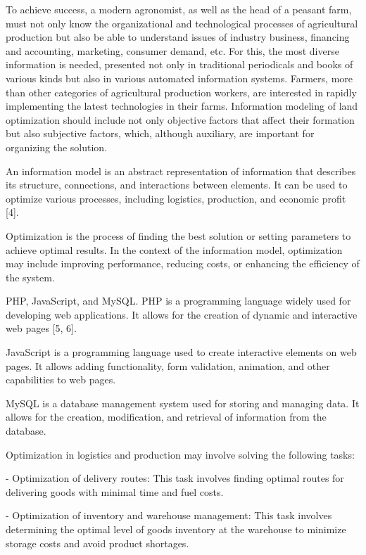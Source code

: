 To achieve success, a modern agronomist, as well as the head of a
peasant farm, must not only know the organizational and technological
processes of agricultural production but also be able to understand
issues of industry business, financing and accounting, marketing,
consumer demand, etc. For this, the most diverse information is needed,
presented not only in traditional periodicals and books of various kinds
but also in various automated information systems. Farmers, more than
other categories of agricultural production workers, are interested in
rapidly implementing the latest technologies in their farms. Information
modeling of land optimization should include not only objective factors
that affect their formation but also subjective factors, which, although
auxiliary, are important for organizing the solution.

An information model is an abstract representation of information that
describes its structure, connections, and interactions between elements.
It can be used to optimize various processes, including logistics,
production, and economic profit {[}4{]}.

Optimization is the process of finding the best solution or setting
parameters to achieve optimal results. In the context of the information
model, optimization may include improving performance, reducing costs,
or enhancing the efficiency of the system.

PHP, JavaScript, and MySQL. PHP is a programming language widely used
for developing web applications. It allows for the creation of dynamic
and interactive web pages {[}5, 6{]}.

JavaScript is a programming language used to create interactive elements
on web pages. It allows adding functionality, form validation,
animation, and other capabilities to web pages.

MySQL is a database management system used for storing and managing
data. It allows for the creation, modification, and retrieval of
information from the database.

Optimization in logistics and production may involve solving the
following tasks:

- Optimization of delivery routes: This task involves finding optimal
routes for delivering goods with minimal time and fuel costs.

- Optimization of inventory and warehouse management: This task involves
determining the optimal level of goods inventory at the warehouse to
minimize storage costs and avoid product shortages.

